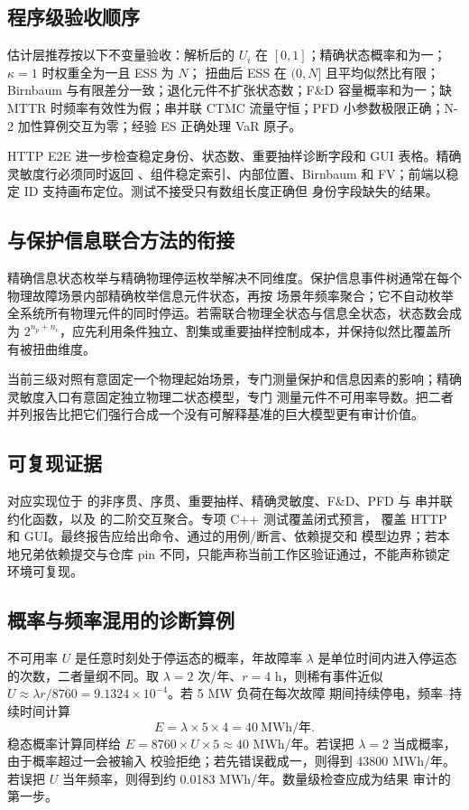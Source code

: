 \subsection{程序级验收顺序}
估计层推荐按以下不变量验收：解析后的 $U_i$ 在 $[0,1]$；精确状态概率和为一；$\kappa=1$ 时权重全为一且 ESS 为 $N$；
扭曲后 ESS 在 $(0,N]$ 且平均似然比有限；Birnbaum 与有限差分一致；退化元件不扩张状态数；F\&D 容量概率和为一；缺 MTTR
时频率有效性为假；串并联 CTMC 流量守恒；PFD 小参数极限正确；N-2 加性算例交互为零；经验 ES 正确处理 VaR 原子。

HTTP E2E 进一步检查稳定身份、状态数、重要抽样诊断字段和 GUI 表格。精确灵敏度行必须同时返回
、组件稳定索引、内部位置、Birnbaum 和 FV；前端以稳定 ID 支持画布定位。测试不接受只有数组长度正确但
身份字段缺失的结果。

\subsection{与保护信息联合方法的衔接}
精确信息状态枚举与精确物理停运枚举解决不同维度。保护信息事件树通常在每个物理故障场景内部精确枚举信息元件状态，再按
场景年频率聚合；它不自动枚举全系统所有物理元件的同时停运。若需联合物理全状态与信息全状态，状态数会成为
$2^{n_p+n_c}$，应先利用条件独立、割集或重要抽样控制成本，并保持似然比覆盖所有被扭曲维度。

当前三级对照有意固定一个物理起始场景，专门测量保护和信息因素的影响；精确灵敏度入口有意固定独立物理二状态模型，专门
测量元件不可用率导数。把二者并列报告比把它们强行合成一个没有可解释基准的巨大模型更有审计价值。

\subsection{可复现证据}
对应实现位于  的非序贯、序贯、重要抽样、精确灵敏度、F\&D、PFD 与
串并联约化函数，以及  的二阶交互聚合。专项 C++ 测试覆盖闭式预言，
 覆盖 HTTP 和 GUI。最终报告应给出命令、通过的用例/断言、依赖提交和
模型边界；若本地兄弟依赖提交与仓库 pin 不同，只能声称当前工作区验证通过，不能声称锁定环境可复现。

\subsection{概率与频率混用的诊断算例}
不可用率 $U$ 是任意时刻处于停运态的概率，年故障率 $\lambda$ 是单位时间内进入停运态的次数，二者量纲不同。取
$\lambda=2$ 次/年、$r=4$ h，则稀有事件近似 $U\approx\lambda r/8760=9.1324\times10^{-4}$。若 5 MW 负荷在每次故障
期间持续停电，频率--持续时间计算
\begin{equation}
 E=\lambda\times5\times4=40\ \text{MWh/年}.
\end{equation}
稳态概率计算同样给 $E=8760\times U\times5\approx40$ MWh/年。若误把 $\lambda=2$ 当成概率，由于概率超过一会被输入
校验拒绝；若先错误截成一，则得到 43800 MWh/年。若误把 $U$ 当年频率，则得到约 0.0183 MWh/年。数量级检查应成为结果
审计的第一步。

